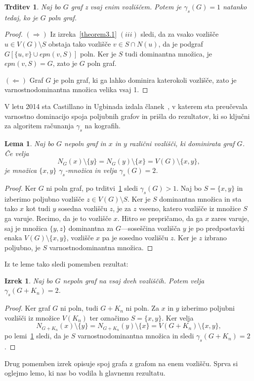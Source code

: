 \documentclass[12pt,a4paper,twoside]{article}
\theoremstyle{definition} %
\theoremstyle{plain} %
\newtheorem{lema}[definicija]{Lema}
\newtheorem{izrek}[definicija]{Izrek}
\newtheorem{trditev}[definicija]{Trditev}
\numberwithin{equation}{section}  %
\begin{document}
\begin{trditev}\label{theorem3.3}
Naj bo $G$ graf z vsaj enim vozliščem. Potem je $\gamma_s(G) = 1$ natanko tedaj, ko je $G$ poln graf.
\end{trditev}
\begin{proof}
$(\Rightarrow)$ Iz izreka~\ref{theorem3.1} $(iii)$ sledi, da za vsako vozlišče $u \in V(G) \setminus S$ obstaja tako vozlišče $v \in S \cap N(u)$, da je podgraf $G[\{u,v\} \cup epn(v,S)]$ poln. Ker je $S$ tudi dominantna množica, je $epn(v, S) = G$, zato je $G$ poln graf.

\medskip
$(\Leftarrow)$ Graf $G$ je poln graf, ki ga lahko dominira katerokoli vozlišče, zato je varnostnodominantna množica velika vsaj 1.
\end{proof}

V letu 2014 sta Castillano in Ugbinada izdala članek~\cite{castillano2014secure}, v katerem sta preučevala varnostno dominacijo spoja poljubnih grafov in prišla do rezultatov, ki so ključni za algoritem računanja $\gamma_s$ na kografih.

\begin{lema}\label{lemaZaGammaS2}{\rm{\cite[Theorem 2.6 $(i)$]{castillano2014secure}}}
Naj bo $G$ nepoln graf in $x$ in $y$ različni vozlišči, ki dominirata graf $G$. Če velja $$N_G(x) \setminus \{y\} = N_G(y) \setminus \{x\} = V(G) \setminus \{x, y\},$$ je množica $\{x, y\}$ $\gamma_s$-množica in velja $\gamma_s(G) = 2$.
\end{lema}
\begin{proof}
Ker $G$ ni poln graf, po trditvi~\ref{theorem3.3} sledi $\gamma_s(G) > 1$. Naj bo $S = \{x, y\}$ in izberimo poljubno vozlišče $z \in V(G) \setminus S$. Ker je $S$ dominantna množica in sta tako $x$ kot tudi $y$ sosedna vozlišču $z$, je za $z$ vseeno, katero vozlišče iz množice $S$ ga varuje. Recimo, da je to vozlišče $x$. Hitro se prepričamo, da ga $x$ zares varuje, saj je množica $\{y, z\}$ dominantna za $G$---soseščina vozlišča $y$ je po predpostavki enaka $V(G) \setminus \{x, y\}$, vozlišče $x$ pa je sosedno vozlišču $z$. Ker je $z$ izbrano poljubno, je $S$ varnostnodominantna množica.
\end{proof}
Iz te leme tako sledi pomemben rezultat:
\begin{izrek}\label{theorem3.4}
Naj bo $G$ nepoln graf na vsaj dveh vozliščih. Potem velja $\gamma_s(G + K_n) = 2$.
\end{izrek}
\begin{proof} Ker graf $G$ ni poln, tudi $G + K_n$ ni poln. Za $x$ in $y$ izberimo poljubni vozlišči iz množice $V(K_n)$ ter označimo $S = \{x, y\}$. Ker velja $$N_{G+K_n}(x) \setminus \{y\} = N_{G+K_n}(y) \setminus \{x\} = V({G+K_n}) \setminus \{x, y\},$$po lemi~\ref{lemaZaGammaS2} sledi, da je $S$ varnostnodominantna množica in sledi $\gamma_s(G + K_n) = 2$. 
\end{proof}
Drug pomemben izrek opisuje spoj grafa z grafom na enem vozlišču. Sprva si oglejmo lemo, ki nas bo vodila h glavnemu rezultatu.
\end{document}
